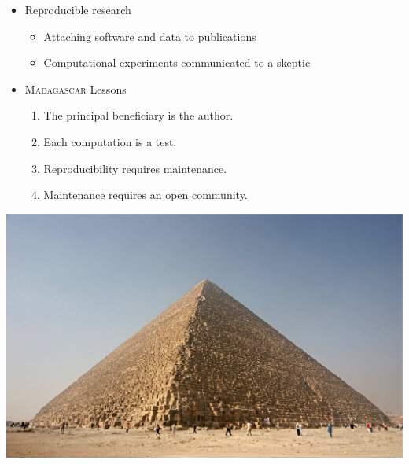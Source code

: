 \begin{frame}
\MadLogo
\bfseries
\centering
  \begin{itemize}
  \item Reproducible research
    \begin{itemize}
    \item Attaching software and data to publications
    \item Computational experiments communicated to a skeptic
    \end{itemize}
  \item \textsc{Madagascar} Lessons
    \begin{enumerate}
    \item The principal beneficiary is the author.
    \item Each computation is a test.
    \item Reproducibility requires maintenance.
    \item Maintenance requires an open community.
    \end{enumerate}
\end{itemize}
    \begin{center}
      \includegraphics[height=0.4\textheight]{Fig/Kheops-Pyramid}
    \end{center}
  \end{frame}
